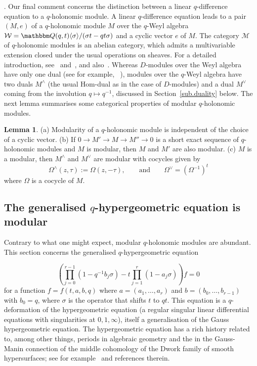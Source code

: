 \documentclass[12pt,reqno]{amsart}
\theoremstyle{definition}
\newtheorem{lemma}[theorem]{Lemma}
\def\BQ{\mathbbm Q}
\def\calW{\mathcal W}
\def\calM{\mathcal M}
\def\s{\sigma}
\def\be{\begin{equation}}
\def\ee{\end{equation}}
\def\Om{\Omega}
\begin{document}
. %
Our final comment concerns the distinction between a linear $q$-difference equation
to a $q$-holonomic module. A linear $q$-difference equation leads to a pair
$(M,e)$ of a $q$-holonomic module $M$ over the $q$-Weyl algebra
$\calW=\BQ(q,t) \langle \s \rangle/(\s t-q t \s)$ and a cyclic vector $e$ of $M$. 
The category $\calM$ of $q$-holonomic modules is an abelian category,
which admits a multivariable extension closed under the usual operations on sheaves.
For a detailed introduction, see~\cite{Coutinho} and~\cite{Sabbah}, and
also~\cite{GL:survey}. Whereas $D$-modules over the Weyl algebra have
only one dual (see for example, ~\cite[Sec.2.2]{Singer:galois-differential}), modules
over the $q$-Weyl algebra have two duals $M^{\wedge}$ (the usual $\mathrm{Hom}$-dual
as in the case of $D$-modules) and a dual $M^{\vee}$ coming from the involution
$q \mapsto q^{-1}$, discussed in Section~\ref{sub.duality} below.
The next lemma summarises some categorical properties of modular $q$-holonomic
modules.

\begin{lemma}
\label{lem.cat}
  \rm{(a)} Modularity of a $q$-holonomic module is independent of the choice
  of a cyclic vector.
  \newline
  \rm{(b)} If $0 \to M' \to M \to M'' \to 0$ is a short exact sequence of
  $q$-holonomic modules and $M$ is modular, then $M$ and $M'$ are also modular.
  \newline
  \rm{(c)} $M$ is a modular, then $M^\wedge$ and $M^\vee$ are modular with
  cocycles given by
  \be
\label{Omduals}
\Om^\wedge(z,\tau):=\Om(z,-\tau), \qquad \text{and}
\qquad \Om^\vee=(\Om^{-1})^t
\ee
where $\Om$ is a cocycle of $M$. 
\end{lemma}

\subsection{The generalised $q$-hypergeometric equation is modular}
\label{sub.qhyper}

Contrary to what one might expect, modular $q$-holonomic modules are abundant.
This section concerns the generalised $q$-hypergeometric equation

\be
\label{gener.qhyper}
\left(\prod_{j=0}^{r-1}(1-q^{-1}b_{j}\sigma)-t\prod_{j=1}^{r}(1-a_{j}\sigma)\right)f
=0
\ee
for a function $f=f(t,a,b,q)$ where $a=(a_1,\dots,a_r)$ and $b=(b_0,\dots,b_{r-1})$
with $b_0=q$, where $\s$ is the operator that shifts $t$ to $qt$. This equation
is a $q$-deformation of the hypergeometric equation (a regular singular linear
differential equations with singularities at $0,1,\infty$), itself a generalisation
of the Gauss hypergeometric equation. The hypergeometric equation has a rich history
related to, among other things, periods in algebraic geometry and the
in the Gauss-Manin connection of the middle cohomology of the Dwork family of
smooth hypersurfaces; see for example~\cite{Beukers,Katz:another} and references
therein. 
\end{document}
